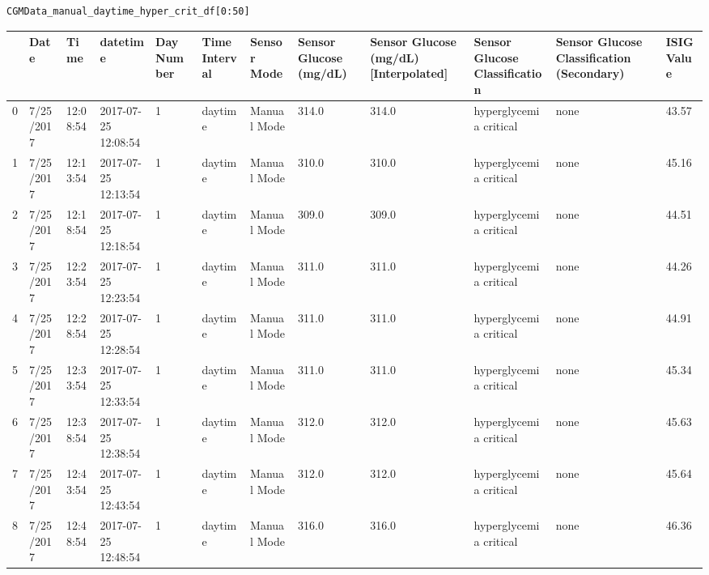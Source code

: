 \bigskip

\begin{verbatim}
CGMData_manual_daytime_hyper_crit_df[0:50]
\end{verbatim}

\bigskip\noindent
\begin{tabular}{p{}p{}p{}p{}p{}p{}p{}p{}p{}p{}p{}p{}}
\toprule
 & Date & Time & datetime & Day Number & Time Interval & Sensor Mode & Sensor Glucose (mg/dL) & Sensor Glucose (mg/dL) [Interpolated] & Sensor Glucose Classification & Sensor Glucose Classification (Secondary) & ISIG Value \\
\hline
0 & 7/25/2017 & 12:08:54 & 2017-07-25 12:08:54 & 1 & daytime & Manual Mode & 314.0 & 314.0 & hyperglycemia critical & none & 43.57 \\
\hline
1 & 7/25/2017 & 12:13:54 & 2017-07-25 12:13:54 & 1 & daytime & Manual Mode & 310.0 & 310.0 & hyperglycemia critical & none & 45.16 \\
\hline
2 & 7/25/2017 & 12:18:54 & 2017-07-25 12:18:54 & 1 & daytime & Manual Mode & 309.0 & 309.0 & hyperglycemia critical & none & 44.51 \\
\hline
3 & 7/25/2017 & 12:23:54 & 2017-07-25 12:23:54 & 1 & daytime & Manual Mode & 311.0 & 311.0 & hyperglycemia critical & none & 44.26 \\
\hline
4 & 7/25/2017 & 12:28:54 & 2017-07-25 12:28:54 & 1 & daytime & Manual Mode & 311.0 & 311.0 & hyperglycemia critical & none & 44.91 \\
\hline
5 & 7/25/2017 & 12:33:54 & 2017-07-25 12:33:54 & 1 & daytime & Manual Mode & 311.0 & 311.0 & hyperglycemia critical & none & 45.34 \\
\hline
6 & 7/25/2017 & 12:38:54 & 2017-07-25 12:38:54 & 1 & daytime & Manual Mode & 312.0 & 312.0 & hyperglycemia critical & none & 45.63 \\
\hline
7 & 7/25/2017 & 12:43:54 & 2017-07-25 12:43:54 & 1 & daytime & Manual Mode & 312.0 & 312.0 & hyperglycemia critical & none & 45.64 \\
\hline
8 & 7/25/2017 & 12:48:54 & 2017-07-25 12:48:54 & 1 & daytime & Manual Mode & 316.0 & 316.0 & hyperglycemia critical & none & 46.36 \\

\end{tabular}

